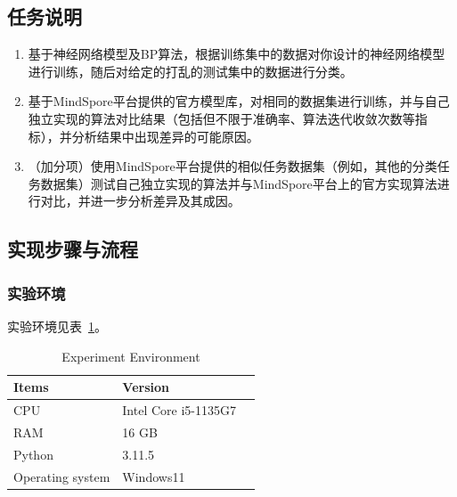 \documentclass[12pt]{article}
\begin{document}
\subsection{任务说明}
\begin{enumerate}%
  \item 基于神经网络模型及BP算法，根据训练集中的数据对你设计的神经网络模型进行训练，随后对给定的打乱的测试集中的数据进行分类。

  \item 基于MindSpore平台提供的官方模型库，对相同的数据集进行训练，并与自己独立实现的算法对比结果（包括但不限于准确率、算法迭代收敛次数等指标），并分析结果中出现差异的可能原因。

  \item （加分项）使用MindSpore平台提供的相似任务数据集（例如，其他的分类任务数据集）测试自己独立实现的算法并与MindSpore平台上的官方实现算法进行对比，并进一步分析差异及其成因。
\end{enumerate}

\subsection{实现步骤与流程}
\subsubsection{实验环境}
实验环境见表~\ref{tab:indicators}。

\begin{table}[!t]
  \caption{Experiment Environment}
  \label{tab:indicators}
  \centering
  \begin{tabular}{m{5cm}<{\centering}m{5cm}<{\centering}m{4cm}<{\centering}}
    \toprule
    \textbf{Items}   & \textbf{Version}     \\[\medskipamount]
    \midrule
    CPU              & Intel Core i5-1135G7 \\[\medskipamount]
    RAM              & 16 GB                \\[\medskipamount]
    Python           & 3.11.5               \\[\medskipamount]
    Operating system & Windows11            \\[\medskipamount]
    \bottomrule
  \end{tabular}
\end{table}
\end{document}
